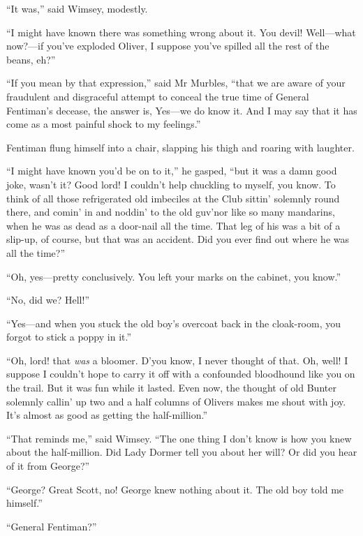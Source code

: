 \enquote{It was,} said Wimsey, modestly.

\enquote{I might have known there was something wrong about it. You devil! Well\allowbreak---\allowbreak what now?---if you've exploded Oliver, I suppose you've spilled all the rest of the beans, eh?}

\enquote{If you mean by that expression,} said Mr Murbles, \enquote{that we are aware of your fraudulent and disgraceful attempt to conceal the true time of General Fentiman's decease, the answer is, Yes\allowbreak---\allowbreak we do know it. And I may say that it has come as a most painful shock to my feelings.}

Fentiman flung himself into a chair, slapping his thigh and roaring with laughter.

\enquote{I might have known you'd be on to it,} he gasped, \enquote{but it was a damn good joke, wasn't it? Good lord! I couldn't help chuckling to myself, you know. To think of all those refrigerated old imbeciles at the Club sittin' solemnly round there, and comin' in and noddin' to the old guv'nor like so many mandarins, when he was as dead as a door-nail all the time. That leg of his was a bit of a slip-up, of course, but that was an accident. Did you ever find out where he was all the time?}

\enquote{Oh, yes\allowbreak---\allowbreak pretty conclusively. You left your marks on the cabinet, you know.}

\enquote{No, did we? Hell!}

\enquote{Yes\allowbreak---\allowbreak and when you stuck the old boy's overcoat back in the cloak-room, you forgot to stick a poppy in it.}

\enquote{Oh, lord! that \textit{was} a bloomer. D'you know, I never thought of that. Oh, well! I suppose I couldn't hope to carry it off with a confounded bloodhound like you on the trail. But it was fun while it lasted. Even now, the thought of old Bunter solemnly callin' up two and a half columns of Olivers makes me shout with joy. It's almost as good as getting the half-million.}

\enquote{That reminds me,} said Wimsey. \enquote{The one thing I don't know is how you knew about the half-million. Did Lady Dormer tell you about her will? Or did you hear of it from George?}

\enquote{George? Great Scott, no! George knew nothing about it. The old boy told me himself.}

\enquote{General Fentiman?}

